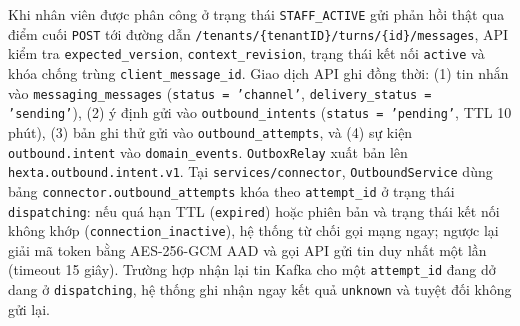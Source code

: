 Khi nhân viên được phân công ở trạng thái \texttt{STAFF\_\hspace{0pt}ACTIVE} gửi phản hồi thật qua điểm cuối \texttt{POST} tới đường dẫn \texttt{/\hspace{0pt}tenants/\hspace{0pt}\{tenantID\}/\hspace{0pt}turns/\hspace{0pt}\{id\}/\hspace{0pt}messages}, API kiểm tra \texttt{expected\_\hspace{0pt}version}, \texttt{context\_\hspace{0pt}revision}, trạng thái kết nối \texttt{active} và khóa chống trùng \texttt{client\_\hspace{0pt}message\_\hspace{0pt}id}.
Giao dịch API ghi đồng thời: (1) tin nhắn vào \texttt{messaging\_\hspace{0pt}messages} (\texttt{status = 'channel'}, \texttt{delivery\_\hspace{0pt}status = 'sending'}), (2) ý định gửi vào \texttt{outbound\_\hspace{0pt}intents} (\texttt{status = 'pending'}, TTL 10 phút), (3) bản ghi thử gửi vào \texttt{outbound\_\hspace{0pt}attempts}, và (4) sự kiện \texttt{outbound.\hspace{0pt}intent} vào \texttt{domain\_\hspace{0pt}events}.
\texttt{Outbox\hspace{0pt}Relay} xuất bản lên \texttt{hexta.\hspace{0pt}outbound.\hspace{0pt}intent.\hspace{0pt}v1}.
Tại \texttt{services/\hspace{0pt}connector}, \texttt{Outbound\hspace{0pt}Service} dùng bảng \texttt{connector.\hspace{0pt}outbound\_\hspace{0pt}attempts} khóa theo \texttt{attempt\_\hspace{0pt}id} ở trạng thái \texttt{dispatching}: nếu quá hạn TTL (\texttt{expired}) hoặc phiên bản và trạng thái kết nối không khớp (\texttt{connection\_\hspace{0pt}inactive}), hệ thống từ chối gọi mạng ngay; ngược lại giải mã token bằng AES-256-GCM AAD và gọi API gửi tin duy nhất một lần (timeout 15 giây).
Trường hợp nhận lại tin Kafka cho một \texttt{attempt\_\hspace{0pt}id} đang dở dang ở \texttt{dispatching}, hệ thống ghi nhận ngay kết quả \texttt{unknown} và tuyệt đối không gửi lại.
